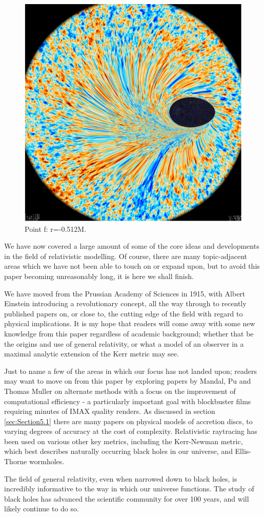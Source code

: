 \documentclass[oneside,openright,frontopenright, singlespacing]{dmathesis}
\begin{document}
\begin{figure}[!ht]
	\centering
	\includegraphics[width=0.6\linewidth]{img/plunging6}
	\caption{Point f: r=-0.512M.}
	\label{fig:Figure6.7}
\end{figure}


\begin{conclusion}
	We have now covered a large amount of some of the core ideas and developments in the field of relativistic modelling. Of course, there are many topic-adjacent areas which we have not been able to touch on or expand upon, but to avoid this paper becoming unreasonably long, it is here we shall finish. 

\vspace{1em}
	We have moved from the Prussian Academy of Sciences in 1915, with Albert Einstein introducing a revolutionary concept, all the way through to recently published papers on, or close to, the cutting edge of the field with regard to physical implications. It is my hope that readers will come away with some new knowledge from this paper regardless of academic background; whether that be the origins and use of general relativity, or what a model of an observer in a maximal analytic extension of the Kerr metric may see.

\vspace{1em}
	Just to name a few of the areas in which our focus has not landed upon; readers may want to move on from this paper by exploring papers by Mandal\cite{mandal2021non}, Pu\cite{pu2016odyssey} and Thomas Muller\cite{muller2021adaptive} on alternate methods with a focus on the improvement of computational efficiency - a particularly important goal with blockbuster films requiring minutes of IMAX quality renders. As discussed in section \ref{sec:Section5.1} there are many papers on physical models of accretion discs, to varying degrees of accuracy at the cost of complexity. Relativistic raytracing has been used on various other key metrics, including the Kerr-Newman metric, which best describes naturally occurring black holes in our universe, and Ellis-Thorne wormholes\cite{thorne2015visualizing}.

\vspace{1em}
	 The field of general relativity, even when narrowed down to black holes, is incredibly informative to the way in which our universe functions. The study of black holes has advanced the scientific community for over 100 years, and will likely continue to do so.
\end{conclusion}
\end{document}
